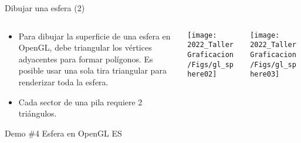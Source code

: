 \begin{frame}{Dibujar una esfera (2)}
\begin{columns}
\begin{column}{0.4\textwidth}
\begin{itemize}
\item Para dibujar la superficie de una esfera en OpenGL, debe triangular los vértices adyacentes para formar polígonos. Es posible usar una sola tira triangular para renderizar toda la esfera.
\item Cada sector de una pila requiere 2 triángulos.
\end{itemize}
\begin{block}{Demo \#4}
Esfera en OpenGL ES
\end{block}

\end{column}
\begin{column}{0.3\textwidth}
\begin{center}
 \texttt{[image: 2022\_TallerGraficacion/Figs/gl\_sphere02]}
 \end{center}

\end{column}
\begin{column}{0.3\textwidth}
\begin{center}
 \texttt{[image: 2022\_TallerGraficacion/Figs/gl\_sphere03]}
 \end{center}
\end{column}
\end{columns}


\end{frame}


